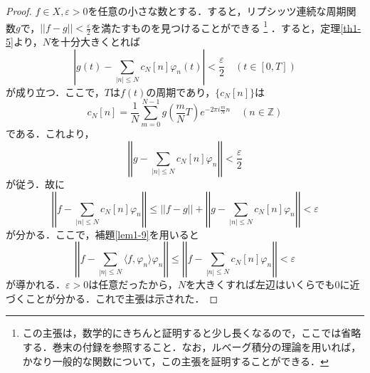 \documentclass[a4j]{jsbook}
\numberwithin{theorem}{chapter}  %
\begin{document}
\begin{proof}
\(f\in X, \varepsilon>0\)を任意の小さな数とする．すると，リプシッツ連続な周期関数\(g\)で，\(\displaystyle ||f-g||<\frac{\varepsilon}{2}\)を満たすものを見つけることができる
\footnote{この主張は，数学的にきちんと証明すると少し長くなるので，ここでは省略する．巻末の付録を参照すること．なお，ルベーグ積分の理論を用いれば，かなり一般的な関数について，この主張を証明することができる．
}
．すると，定理\ref{th1-5}より，\(N\)を十分大きくとれば
\begin{equation*}
    \left|g(t)-\sum_{|n|\leq N}c_N[n]\varphi_n(t)\right|<\frac{\varepsilon}{2}\quad (t\in[0, T])
\end{equation*}
が成り立つ．ここで，\(T\)は\(f(t)\)の周期であり，\(\{c_N[n]\}\)は
\begin{equation*}
    c_N[n]=\frac{1}{N}\sum_{m=0}^{N-1}g\left(\frac{m}{N}T\right)e^{-2\pi i\frac{m}{N}n}\quad (n\in\mathbb{Z})
\end{equation*}
である．これより，
\begin{equation*}
    \left|\left|g-\sum_{|n|\leq N}c_N[n]\varphi_n\right|\right|<\frac{\varepsilon}{2}
\end{equation*}
が従う．故に
\begin{equation*}
    \left|\left|f-\sum_{|n|\leq N} c_N[n]\varphi_n\right|\right|\leq||f-g||+\left|\left|g-\sum_{|n|\leq N} c_N[n]\varphi_n\right|\right|<\varepsilon
\end{equation*}
が分かる．ここで，補題\ref{lem1-9}を用いると
\begin{equation*}
    \left|\left|f-\sum_{|n|\leq N}\langle f, \varphi_n\rangle\varphi_n\right|\right|\leq\left|\left|f-\sum_{|n|\leq N}c_N[n]\varphi_n\right|\right|<\varepsilon
\end{equation*}
が導かれる．\(\varepsilon>0\)は任意だったから，\(N\)を大きくすれば左辺はいくらでも0に近づくことが分かる．これで主張は示された．
\end{proof}
\end{document}
